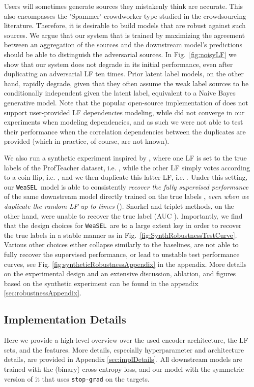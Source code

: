 \documentclass{article}
\newcommand{\weasel}{\texttt{WeaSEL}}\newcommand{\brackets}[1]{\left( #1 \right)}
\begin{document}
 Users will sometimes generate sources they mistakenly think are accurate. This also encompasses the 'Spammer' crowdworker-type studied in the crowdsourcing literature.
Therefore, it is desirable to build models that are robust against such sources.
We argue that our system that is trained by maximizing the agreement between an aggregation of the sources and the downstream model's predictions should be able to distinguish the adversarial sources.
In Fig.~\ref{fig:noisyLF} we show that our system does not degrade in its initial performance, even after duplicating an adversarial LF ten times.
Prior latent label models, on the other hand, rapidly degrade, given that they often assume the weak label sources to be conditionally independent given the latent label, equivalent to a Naive Bayes generative model.
Note that the popular open-source implementation of \cite{Snorkel, Multitask}
does not support user-provided LF dependencies modeling, while \cite{triplets, TripletsMean} did not converge in our experiments when modeling dependencies, and as such we were not able to test their performance when the correlation dependencies between the duplicates are provided (which in practice, of course, are not known).

We also run a synthetic experiment inspired by \cite{MaxMIG}, where one LF is set to the true labels of the ProfTeacher dataset, i.e. , while the other LF simply votes according to a coin flip, i.e. , and we then duplicate this latter LF, i.e. . Under this setting, our \weasel\ model is able to consistently \emph{recover the fully supervised performance} of the same downstream model directly trained on the true labels , \emph{even when we duplicate the random LF up to  times} (). 
Snorkel and triplet methods, on the other hand, were unable to recover the true label (AUC ).
Importantly, we find that the design choices for \weasel\ are to a large extent key in order to recover the true labels in a stable manner as in Fig.~\ref{fig:SynthRobustnessTestCurve}. Various other choices either collapse similarly to the baselines, are not able to fully recover the supervised performance, or lead to unstable test performance curves, see Fig. \ref{fig:syntheticRobustnessAppendix} in the appendix. 
More details on the experimental design and an extensive discussion, ablation, and figures based on the synthetic experiment can be found in the appendix \ref{sec:robustnessAppendix}.

\subsection{Implementation Details}
Here we provide a high-level overview over the used encoder architecture, the LF sets, and the features. More details, especially hyperparameter and architecture details, are provided in Appendix \ref{sec:implDetails}. All downstream models are trained with the (binary) cross-entropy loss, and our model with the symmetric version of it that uses \texttt{stop-grad} on the targets.
\end{document}
